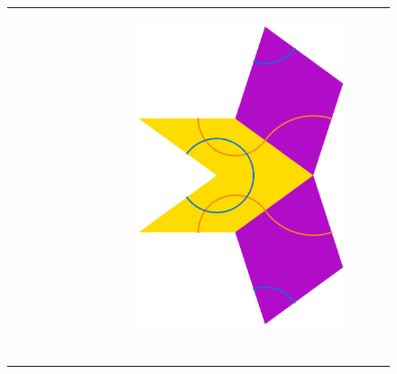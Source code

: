 \documentclass[
  oneside,
  11pt, a4paper,
  footinclude=true,
  headinclude=true,
  cleardoublepage=empty
]{scrbook}
\begin{document}
\begin{figure}[H]
\begin{tabular}{cc}
\begin{subfigure}[b]{0.4\textwidth}
	        \end{subfigure}   &
            \begin{subfigure}[b]{0.4\textwidth}
             \centering
             \includegraphics[scale=0.4]{SkinnyInflation1}
             \end{subfigure}   \\
	       	 \begin{subfigure}[b]{0.4\textwidth}
             \centering

\end{subfigure}
\end{tabular}
\end{figure}
\end{document}
